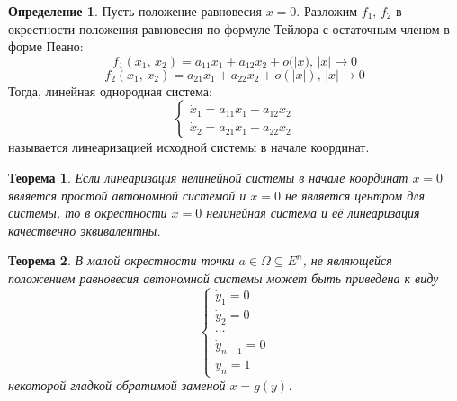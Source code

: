 \documentclass[a4paper,12pt]{article}
\theoremstyle{plain}
\newtheorem{theorem}{Теорема}[section]
\theoremstyle{definition}
\newtheorem{definition}{Определение}[section]
\theoremstyle{remark}
\begin{document}
\begin{definition}
	Пусть положение равновесия $x = 0$. Разложим $f_1,\, f_2$ в окрестности положения равновесия по формуле Тейлора с остаточным членом в форме Пеано:
	\[f_1(x_1,\,x_2) = a_{11}x_1 + a_{12}x_2 + o(|x),\, |x| \to 0\]
	\[f_2(x_1,\,x_2) = a_{21}x_1 + a_{22}x_2 + o(|x|),\, |x| \to 0\]
	Тогда, линейная однородная система:
	\[\begin{cases}
			\dot{x}_1 = a_{11}x_1 + a_{12}x_2 \\
			\dot{x}_2 = a_{21}x_1 + a_{22}x_2
		\end{cases}\]
	называется линеаризацией исходной системы в начале координат.
\end{definition}

\begin{theorem}
	Если линеаризация нелинейной системы в начале координат $x = 0$ является простой автономной системой и $x = 0$ не является центром для системы, то в окрестности $x = 0$ нелинейная система и её линеаризация качественно эквивалентны.
\end{theorem}

\begin{theorem}
	В малой окрестности точки $a \in \Omega \subseteq E^n$, не являющейся положением равновесия автономной системы может быть приведена к виду
	\[\begin{cases}
			\dot{y}_1 = 0     \\
			\dot{y}_2 = 0     \\
			\cdots            \\
			\dot{y}_{n-1} = 0 \\
			\dot{y}_n = 1
		\end{cases}\]
	некоторой гладкой обратимой заменой $x = g(y)$.
\end{theorem}
\end{document}
